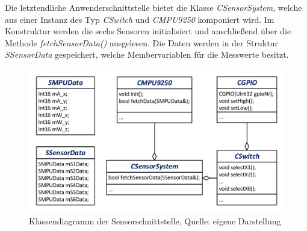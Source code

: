 Die letztendliche Anwenderschnittstelle bietet die Klasse \textit{CSensorSystem}, welche aus einer Instanz des Typ \textit{CSwitch} und \textit{CMPU9250} komponiert wird. Im Konstruktur werden die sechs Sensoren initialisiert und anschließend über die Methode \textit{fetchSensorData()} ausgelesen. Die Daten werden in der Struktur \textit{SSensorData} gespeichert, welche Membervariablen für die Messwerte besitzt.
\begin{figure}[!h]
\centering
\includegraphics[width=0.7\linewidth]{img/SW_0_Sensoren_KD.pdf}
\caption{Klassendiagramm der Sensorschnittstelle, Quelle: eigene Darstellung}
\end{figure}

